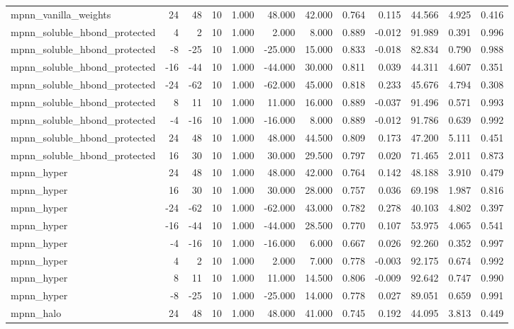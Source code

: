 \begin{table}
\begin{tabular}{lrrrrrrrrrrr}
mpnn\_vanilla\_weights & 24 & 48 & 10 & 1.000 & 48.000 & 42.000 & 0.764 & 0.115 & 44.566 & 4.925 & 0.416 \\
mpnn\_soluble\_hbond\_protected & 4 & 2 & 10 & 1.000 & 2.000 & 8.000 & 0.889 & -0.012 & 91.989 & 0.391 & 0.996 \\
mpnn\_soluble\_hbond\_protected & -8 & -25 & 10 & 1.000 & -25.000 & 15.000 & 0.833 & -0.018 & 82.834 & 0.790 & 0.988 \\
mpnn\_soluble\_hbond\_protected & -16 & -44 & 10 & 1.000 & -44.000 & 30.000 & 0.811 & 0.039 & 44.311 & 4.607 & 0.351 \\
mpnn\_soluble\_hbond\_protected & -24 & -62 & 10 & 1.000 & -62.000 & 45.000 & 0.818 & 0.233 & 45.676 & 4.794 & 0.308 \\
mpnn\_soluble\_hbond\_protected & 8 & 11 & 10 & 1.000 & 11.000 & 16.000 & 0.889 & -0.037 & 91.496 & 0.571 & 0.993 \\
mpnn\_soluble\_hbond\_protected & -4 & -16 & 10 & 1.000 & -16.000 & 8.000 & 0.889 & -0.012 & 91.786 & 0.639 & 0.992 \\
mpnn\_soluble\_hbond\_protected & 24 & 48 & 10 & 1.000 & 48.000 & 44.500 & 0.809 & 0.173 & 47.200 & 5.111 & 0.451 \\
mpnn\_soluble\_hbond\_protected & 16 & 30 & 10 & 1.000 & 30.000 & 29.500 & 0.797 & 0.020 & 71.465 & 2.011 & 0.873 \\
mpnn\_hyper & 24 & 48 & 10 & 1.000 & 48.000 & 42.000 & 0.764 & 0.142 & 48.188 & 3.910 & 0.479 \\
mpnn\_hyper & 16 & 30 & 10 & 1.000 & 30.000 & 28.000 & 0.757 & 0.036 & 69.198 & 1.987 & 0.816 \\
mpnn\_hyper & -24 & -62 & 10 & 1.000 & -62.000 & 43.000 & 0.782 & 0.278 & 40.103 & 4.802 & 0.397 \\
mpnn\_hyper & -16 & -44 & 10 & 1.000 & -44.000 & 28.500 & 0.770 & 0.107 & 53.975 & 4.065 & 0.541 \\
mpnn\_hyper & -4 & -16 & 10 & 1.000 & -16.000 & 6.000 & 0.667 & 0.026 & 92.260 & 0.352 & 0.997 \\
mpnn\_hyper & 4 & 2 & 10 & 1.000 & 2.000 & 7.000 & 0.778 & -0.003 & 92.175 & 0.674 & 0.992 \\
mpnn\_hyper & 8 & 11 & 10 & 1.000 & 11.000 & 14.500 & 0.806 & -0.009 & 92.642 & 0.747 & 0.990 \\
mpnn\_hyper & -8 & -25 & 10 & 1.000 & -25.000 & 14.000 & 0.778 & 0.027 & 89.051 & 0.659 & 0.991 \\
mpnn\_halo & 24 & 48 & 10 & 1.000 & 48.000 & 41.000 & 0.745 & 0.192 & 44.095 & 3.813 & 0.449 \\

\end{tabular}
\end{table}
